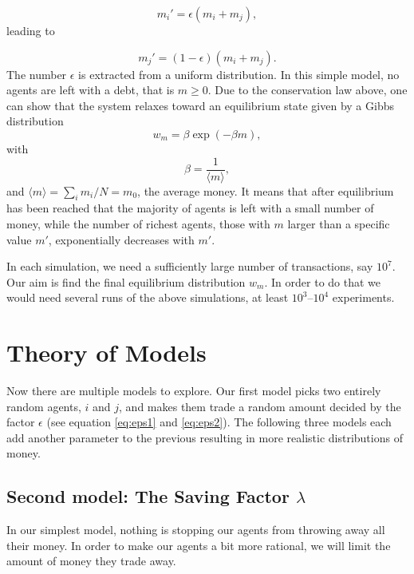 \documentclass[12pt,a4paper]{article}
\begin{document}
\begin{equation}
  m_i' = \epsilon(m_i+m_j), \label{eq:eps1}
\end{equation}
leading to

\begin{equation}
  m_j'= (1-\epsilon)(m_i+m_j). \label{eq:eps2}
\end{equation}
The number $\epsilon$ is extracted from a uniform distribution.
In this simple model, no agents are left with a debt, that is $m\ge 0$.
Due to the conservation law above, one can show that the system relaxes toward an equilibrium
state given by a Gibbs distribution
\begin{equation*}
  w_m=\beta \exp{(-\beta m)},
\end{equation*}
with
\begin{equation*}
  \beta = \frac{1}{\langle m\rangle},
\end{equation*}
and $\langle m\rangle=\sum_i m_i/N=m_0$, the average money.
It means that after equilibrium has been reached that the majority of agents is left with a small
number of money, while the number of richest agents, those with $m$ larger than a specific value $m'$,
exponentially decreases with $m'$.

In each simulation, we need a sufficiently large number of transactions, say $10^7$. Our aim is find the final equilibrium distribution $w_m$. In order to do that we would need
several runs of the above simulations, at least $10^3$--$10^4$ experiments.

\section{Theory of Models}

Now there are multiple models to explore. Our first model picks two entirely random agents, $i$ and $j$, and makes them trade a random amount decided by the factor $\epsilon$ (see equation \eqref{eq:eps1} and \eqref{eq:eps2}).
The following three models each add another parameter to the previous resulting in more realistic distributions of money.

\subsection{Second model: The Saving Factor $\lambda$} \label{sec:model2}
In our simplest model, nothing is stopping our agents from throwing away all their money. In order to make our agents a bit more rational, we will limit the amount of money they trade away.
\end{document}
